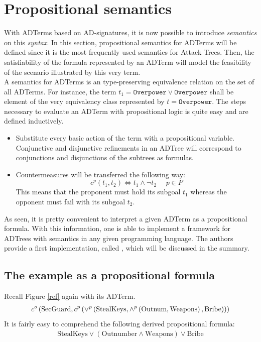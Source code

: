 \documentclass[conference]{IEEEtran}
\begin{document}
\section{Propositional semantics}
With ADTerms based on AD-signatures, it is now possible to introduce \textit{semantics} on this \textit{syntax}. In this section, propositional semantics for ADTerms will be defined since it is the most frequently used semantics for Attack Trees. Then, the satisfiability of the formula represented by an ADTerm will model the feasibility of the scenario illustrated by this very term.\\
A semantics for ADTerms is an type-preserving equivalence relation on the set of all ADTerms. For instance, the term $t_1 = \texttt{Overpower} \vee \texttt{Overpower}$ shall be element of the very equivalency class represented by $t = \texttt{Overpower}$. The steps necessary to evaluate an ADTerm with propositional logic is quite easy and are defined inductively.
\begin{itemize}
	\item Substitute every basic action of the term with a propositional variable. Conjunctive and disjunctive refinements in an ADTree will correspond to conjunctions and disjunctions of the subtrees as formulas. 
	\item Countermeasures will be transferred the following way:
	$$c^p(t_1,t_2)\Leftrightarrow t_1 \wedge \neg t_2~~~~~~ p \in P $$
	This means that the proponent must hold its subgoal $t_1$ whereas the opponent must fail with its subgoal $t_2$.
\end{itemize}
As seen, it is pretty convenient to interpret a given ADTerm as a propositional formula. With this information, one is able to implement a framework for ADTrees with semantics in any given programming language. The authors provide a first implementation, called , which will be discussed in the summary.
\subsection{The example as a propositional formula}
Recall Figure \ref{ref} again with its ADTerm.
\begin{align*}
\small
c^o\left(\text{SecGuard}, c^p \left( \vee^p \left( \text{StealKeys}, \wedge^p \left( \text{Outnum},\text{Weapons} \right), \text{Bribe}  \right)  \right) \right)
\end{align*}
It is fairly easy to comprehend the following derived propositional formula:
\begin{align*}
\text{StealKeys} \vee \left( \text{Outnumber}\wedge\text{Weapons} \right) \vee \text{Bribe}
\end{align*}
\end{document}
